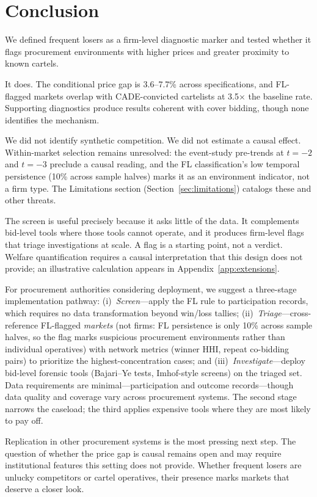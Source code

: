 \section{Conclusion}
\label{sec:conclusion}

We defined frequent losers as a firm-level diagnostic marker and
tested whether it flags procurement environments with higher prices
and greater proximity to known cartels.

It does. The conditional price gap is 3.6--7.7\% across
specifications, and FL-flagged markets overlap with CADE-convicted
cartelists at 3.5$\times$ the baseline rate. Supporting diagnostics
produce results coherent with cover bidding, though none identifies
the mechanism.

We did not identify synthetic competition. We did not estimate a
causal effect. Within-market selection remains unresolved: the event-study
pre-trends at $t = -2$ and $t = -3$ preclude a causal reading, and
the FL classification's low temporal persistence (10\% across sample
halves) marks it as an environment indicator, not a firm type. The
Limitations section (Section~\ref{sec:limitations}) catalogs these
and other threats.

The screen is useful precisely because it asks little of the data. It
complements bid-level tools where those tools cannot operate, and it
produces firm-level flags that triage investigations at scale. A flag
is a starting point, not a verdict. Welfare quantification requires a
causal interpretation that this design does not provide; an
illustrative calculation appears in
Appendix~\ref{app:extensions}.

For procurement authorities considering deployment, we suggest a
three-stage implementation pathway: (i)~\emph{Screen}---apply the FL
rule to participation records, which requires no data transformation
beyond win/loss tallies; (ii)~\emph{Triage}---cross-reference
FL-flagged \emph{markets} (not firms: FL persistence is only 10\%
across sample halves, so the flag marks suspicious procurement
environments rather than individual operatives) with network metrics
(winner HHI, repeat co-bidding pairs) to prioritize the
highest-concentration cases; and (iii)~\emph{Investigate}---deploy
bid-level forensic tools (Bajari--Ye tests, Imhof-style screens) on
the triaged set. Data requirements are minimal---participation and
outcome records---though data quality and coverage vary across
procurement systems. The second stage narrows the caseload; the third
applies expensive tools where they are most likely to pay off.

Replication in other procurement systems is the most pressing next
step. The question of whether the price gap is causal remains open
and may require institutional features this setting does not provide.
Whether frequent losers are unlucky competitors or cartel operatives,
their presence marks markets that deserve a closer look.
